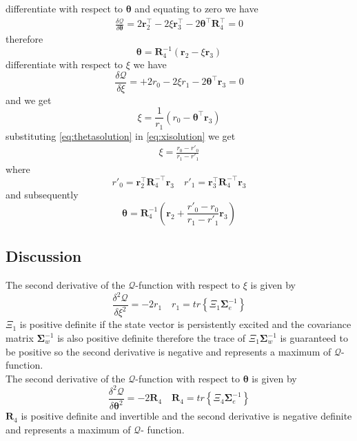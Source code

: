 \documentclass[]{article}
\begin{document}
differentiate with respect to $\boldsymbol\theta$ and equating to zero we have
\begin{eqnarray}
\frac{\delta \mathcal Q}{\delta \boldsymbol \theta}=2\mathbf r_2^\top-2\xi \mathbf r_3^\top-2\boldsymbol \theta^\top\mathbf R_4^\top=0
\end{eqnarray}
therefore
\begin{equation}\label{eq:thetasolution}
 \boldsymbol \theta=\mathbf R_4^{-1}(\mathbf r_2-\xi\mathbf r_3)
\end{equation}
differentiate with respect to $\xi$ we have
\begin{equation}
 \frac{\delta \mathcal Q}{\delta \xi}=+2r_0-2\xi r_1-2\boldsymbol\theta^\top\mathbf r_3=0
\end{equation}
and we get
\begin{equation}\label{eq:xisolution}
 \xi=\frac{1}{r_1}(r_0- \boldsymbol \theta^\top \mathbf r_3)
\end{equation}
substituting \eqref{eq:thetasolution} in \eqref{eq:xisolution} we get
\begin{eqnarray}
\xi=\frac{r_0-r'_0}{r_1-r'_1}
\end{eqnarray}
where
\begin{equation}
 r'_0=\mathbf r_2^\top \mathbf R_4^{-\top}\mathbf r_3 \quad r'_1=\mathbf r_3^\top \mathbf R_4^{-\top}\mathbf r_3
\end{equation}
and subsequently
\begin{equation}
 \boldsymbol \theta=\mathbf R_4^{-1}(\mathbf r_2+\frac{r'_0-r_0}{r_1-r'_1} \mathbf r_3)
\end{equation}
\subsection*{Discussion}
The second derivative of the $\mathcal Q$-function with respect to $\xi$ is given by
\begin{equation}
 \frac{\delta^2 \mathcal Q}{\delta \xi^2}=-2 r_1 \quad r_1=tr \left\lbrace \Xi_1\boldsymbol\Sigma_e^{-1}\right\rbrace
\end{equation}
$\Xi_1 $ is positive definite if the state vector is persistently excited and the covariance matrix $\boldsymbol\Sigma_w^{-1}$ is also positive definite therefore the trace of $\Xi_1\boldsymbol\Sigma_w^{-1}$ is guaranteed to be positive so the second derivative is negative and represents a maximum of $\mathcal Q$-function.\\
The second derivative of the $\mathcal Q$-function with respect to $\boldsymbol \theta$ is given by
\begin{equation}
 \frac{\delta^2 \mathcal Q}{\delta \boldsymbol\theta^2}=-2\mathbf R_4 \quad \mathbf R_4= tr \left\lbrace\Xi_4 \boldsymbol\Sigma_e^{-1}\right\rbrace
\end{equation}
$\mathbf R_4$ is positive definite and invertible and the second derivative is negative definite and represents a maximum of $\mathcal Q$- function.
\end{document}
